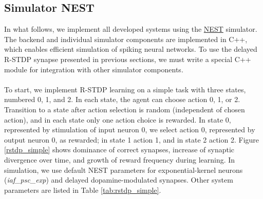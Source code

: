 \documentclass[a4paper,12pt,openright]{book}
\begin{document}
\subsection{Simulator NEST}
In what follows, we implement all developed systems using the \href{https://www.nest-simulator.org/}{NEST} simulator. The backend and individual simulator components are implemented in C++, which enables efficient simulation of spiking neural networks. To use the delayed R-STDP synapse presented in previous sections, we must write a special C++ module for integration with other simulator components.
\\
\\
To start, we implement R-STDP learning on a simple task with three states, numbered 0, 1, and 2. In each state, the agent can choose action 0, 1, or 2. Transition to a state after action selection is random (independent of chosen action), and in each state only one action choice is rewarded. In state 0, represented by stimulation of input neuron 0, we select action 0, represented by output neuron 0, as rewarded; in state 1 action 1, and in state 2 action 2. Figure \ref{rstdp_simple} shows dominance of correct synapses, increase of synaptic divergence over time, and growth of reward frequency during learning. In simulation, we use default NEST parameters for exponential-kernel neurons (\textit{iaf\_psc\_exp}) and delayed dopamine-modulated synapses. Other system parameters are listed in Table \ref{tab:rstdp_simple}.
 
\end{document}
